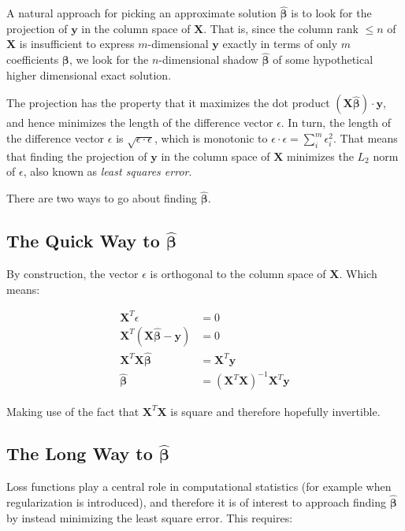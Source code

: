 A natural approach for picking an approximate solution $\mathbf{\hat{\beta}}$ is to look for the projection of $\mathbf{y}$ in the column space of $\mathbf{X}$. That is, since the column rank $\leq n$ of $\mathbf{X}$ is insufficient to express $m$-dimensional $\mathbf{y}$ exactly in terms of only $m$ coefficients $\mathbf{\beta}$, we look for the $n$-dimensional shadow $\mathbf{\hat{\beta}}$ of some hypothetical higher dimensional exact solution. 

The projection has the property that it maximizes the dot product $(\mathbf{X}\mathbf{\hat{\beta}})\cdot \mathbf{y}$, and hence minimizes the length of the difference vector $\epsilon$. In turn, the length of the difference vector $\epsilon$ is $\sqrt{\epsilon\cdot\epsilon}$, which is monotonic to $\epsilon\cdot\epsilon = \sum^m_i \epsilon_i^2$. That means that finding the projection of $\mathbf{y}$ in the column space of $\mathbf{X}$ minimizes the  $L_2$ norm of $\epsilon$, also known as \textit{least squares error}.

There are two ways to go about finding $\mathbf{\hat{\beta}}$.

\subsection{The Quick Way to $\mathbf{\hat{\beta}}$}

By construction, the vector $\epsilon$ is orthogonal to the column space of $\mathbf{X}$. Which means:

\begin{equation}
\begin{array}{rl}
\mathbf{X}^T\epsilon &= 0\\
\mathbf{X}^T\left(\mathbf{X}\mathbf{\hat{\beta}}-\mathbf{y}\right) &= 0\\
\mathbf{X}^T\mathbf{X}\mathbf{\hat{\beta}} &= \mathbf{X}^T\mathbf{y}\\
\mathbf{\hat{\beta}} &= \left(\mathbf{X}^T\mathbf{X}\right)^{-1}\mathbf{X}^T\mathbf{y}
\end{array}
\end{equation}

Making use of the fact that $\mathbf{X}^T\mathbf{X}$ is square and therefore hopefully invertible.

\subsection{The Long Way to $\mathbf{\hat{\beta}}$}

Loss functions play a central role in computational statistics (for example when regularization is introduced), and therefore it is of interest to approach finding $\mathbf{\hat{\beta}}$ by instead minimizing the least square error. This requires:

